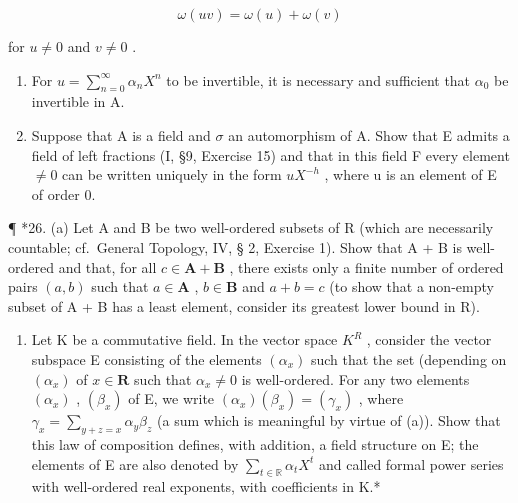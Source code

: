\[
\omega (u v) = \omega (u) + \omega (v)
\]

for \(u \neq 0\) and \(v \neq 0\) .

\begin{enumerate}
\def\labelenumi{(\alph{enumi})}
\setcounter{enumi}{2}
\item
  For \(u = \sum_{n=0}^{\infty} \alpha_n X^n\) to be invertible, it is necessary and sufficient that \(\alpha_0\) be invertible in A.
\item
  Suppose that A is a field and \(\sigma\) an automorphism of A. Show that E admits a field of left fractions (I, §9, Exercise 15) and that in this field F every element \(\neq0\) can be written uniquely in the form \(uX^{-h}\) , where u is an element of E of order 0.
\end{enumerate}

¶ *26. (a) Let A and B be two well-ordered subsets of R (which are necessarily countable; cf.~General Topology, IV, § 2, Exercise 1). Show that A + B is well-ordered and that, for all \(c \in \mathbf{A} + \mathbf{B}\) , there exists only a finite number of ordered pairs \((a, b)\) such that \(a \in \mathbf{A}\) , \(b \in \mathbf{B}\) and \(a + b = c\) (to show that a non-empty subset of A + B has a least element, consider its greatest lower bound in R).

\begin{enumerate}
\def\labelenumi{(\alph{enumi})}
\setcounter{enumi}{1}
\tightlist
\item
  Let K be a commutative field. In the vector space \(K^{R}\) , consider the vector subspace E consisting of the elements \((\alpha_{x})\) such that the set (depending on \((\alpha_{x})\) of \(x \in \mathbf{R}\) such that \(\alpha_{x} \neq 0\) is well-ordered. For any two elements \((\alpha_{x})\) , \((\beta_{x})\) of E, we write \((\alpha_{x})(\beta_{x}) = (\gamma_{x})\) , where \(\gamma_{x} = \sum_{y+z=x} \alpha_{y} \beta_{z}\) (a sum which is meaningful by virtue of (a)). Show that this law of composition defines, with addition, a field structure on E; the elements of E are also denoted by \(\sum_{t \in \mathbb{R}} \alpha_{t} X^{t}\) and called formal power series with well-ordered real exponents, with coefficients in K.*
\end{enumerate}

